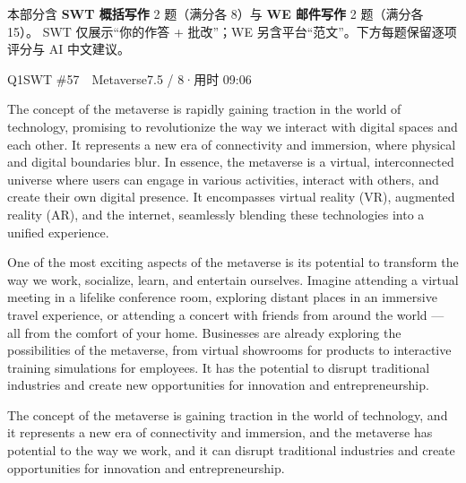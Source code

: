 
\vspace{1mm}
{\small\color{gray} 本部分含 \textbf{SWT 概括写作} 2 题（满分各 8）与 \textbf{WE 邮件写作} 2 题（满分各 15）。
SWT 仅展示“你的作答 + 批改”；WE 另含平台“范文”。下方每题保留逐项评分与 AI 中文建议。}
\vspace{2mm}


\begin{qblock}{Q1\quad SWT \#57\ \ Metaverse}{7.5 / 8\quad·\quad 用时 09:06}

\begin{promptbox}
The concept of the metaverse is rapidly gaining traction in the world of technology, promising to revolutionize the way we interact with digital spaces and each other. It represents a new era of connectivity and immersion, where physical and digital boundaries blur. In essence, the metaverse is a virtual, interconnected universe where users can engage in various activities, interact with others, and create their own digital presence. It encompasses virtual reality (VR), augmented reality (AR), and the internet, seamlessly blending these technologies into a unified experience.

One of the most exciting aspects of the metaverse is its potential to transform the way we work, socialize, learn, and entertain ourselves. Imagine attending a virtual meeting in a lifelike conference room, exploring distant places in an immersive travel experience, or attending a concert with friends from around the world --- all from the comfort of your home. Businesses are already exploring the possibilities of the metaverse, from virtual showrooms for products to interactive training simulations for employees. It has the potential to disrupt traditional industries and create new opportunities for innovation and entrepreneurship.
\end{promptbox}

\begin{youbox}
The concept of the metaverse is gaining traction in the world of technology, and it represents a new era of connectivity and immersion, and the metaverse has potential to  the way we work, and it can disrupt traditional industries and create opportunities for innovation and entrepreneurship.
\end{youbox}


\end{qblock}
